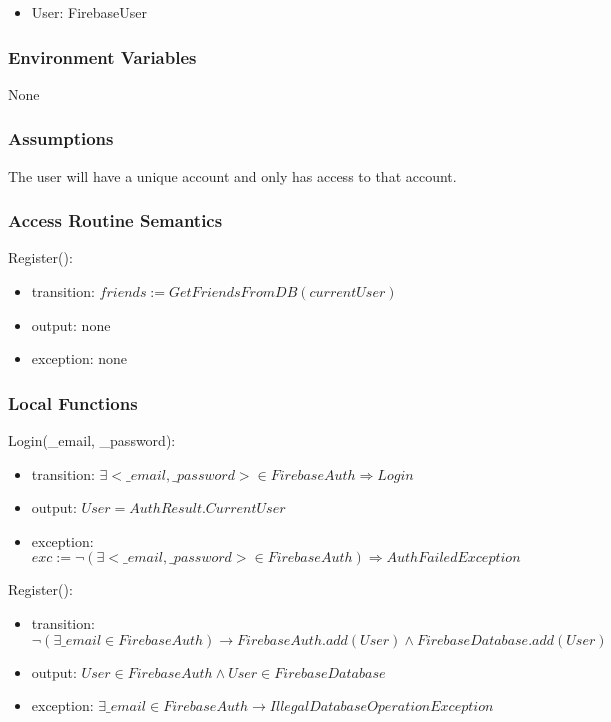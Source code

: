 \documentclass[12pt, titlepage]{article}
\begin{document}
\begin{itemize}
\item User: FirebaseUser
\end{itemize}

\subsubsection{Environment Variables}

None

\subsubsection{Assumptions}

The user will have a unique account and only has access to that account.

\subsubsection{Access Routine Semantics}

\noindent Register():
\begin{itemize}
\item transition: $friends := GetFriendsFromDB(currentUser)$ 
\item output: none
\item exception: none
\end{itemize}

\subsubsection{Local Functions}

\noindent Login(\_email, \_password):
\begin{itemize}
\item transition: $\exists <\_email, \_password> \in FirebaseAuth \Rightarrow Login$
\item output: $User = AuthResult.CurrentUser$
\item exception: $exc:= \lnot(\exists <\_email, \_password> \in FirebaseAuth) \Rightarrow AuthFailedException$
\end{itemize}

\noindent Register():
\begin{itemize}
\item transition: $\lnot(\exists \_email \in FirebaseAuth) \rightarrow FirebaseAuth.add(User) \land FirebaseDatabase.add(User)$ 
\item output: $User \in FirebaseAuth \land User \in FirebaseDatabase$
\item exception: $\exists \_email \in FirebaseAuth \rightarrow IllegalDatabaseOperationException$
\end{itemize}
\end{document}

